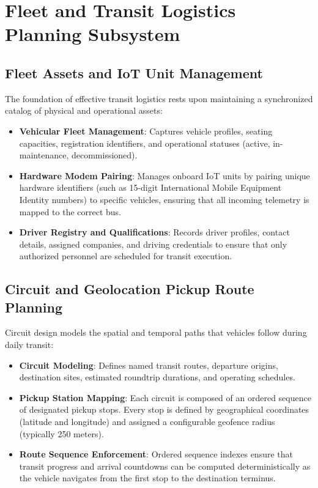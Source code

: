 \section{Fleet and Transit Logistics Planning Subsystem}
\label{sec:fleet_logistics_planning}

\subsection{Fleet Assets and IoT Unit Management}
The foundation of effective transit logistics rests upon maintaining a synchronized catalog of physical and operational assets:
\begin{itemize}
  \item \textbf{Vehicular Fleet Management}: Captures vehicle profiles, seating capacities, registration identifiers, and operational statuses (active, in-maintenance, decommissioned).
  \item \textbf{Hardware Modem Pairing}: Manages onboard IoT units by pairing unique hardware identifiers (such as 15-digit International Mobile Equipment Identity numbers) to specific vehicles, ensuring that all incoming telemetry is mapped to the correct bus.
  \item \textbf{Driver Registry and Qualifications}: Records driver profiles, contact details, assigned companies, and driving credentials to ensure that only authorized personnel are scheduled for transit execution.
\end{itemize}

\subsection{Circuit and Geolocation Pickup Route Planning}
Circuit design models the spatial and temporal paths that vehicles follow during daily transit:
\begin{itemize}
  \item \textbf{Circuit Modeling}: Defines named transit routes, departure origins, destination sites, estimated roundtrip durations, and operating schedules.
  \item \textbf{Pickup Station Mapping}: Each circuit is composed of an ordered sequence of designated pickup stops. Every stop is defined by geographical coordinates (latitude and longitude) and assigned a configurable geofence radius (typically 250 meters).
  \item \textbf{Route Sequence Enforcement}: Ordered sequence indexes ensure that transit progress and arrival countdowns can be computed deterministically as the vehicle navigates from the first stop to the destination terminus.
\end{itemize}

